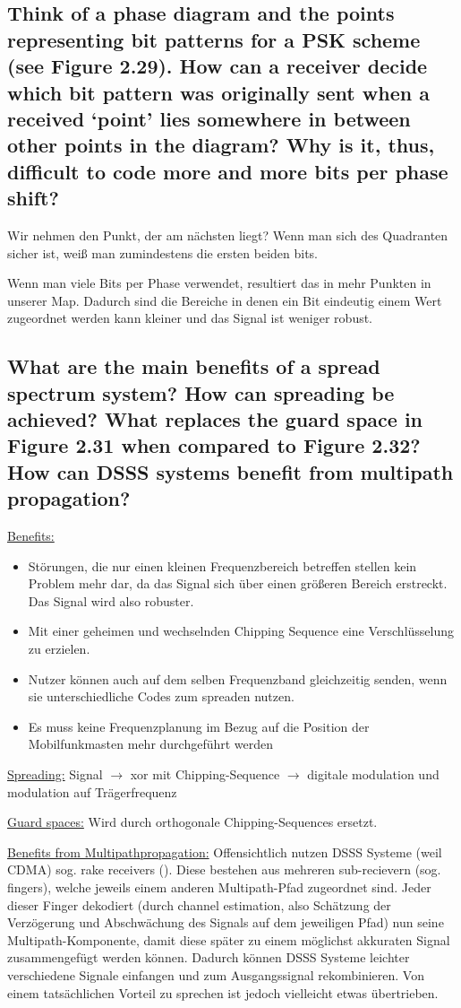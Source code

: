 \subsection{Think of a phase diagram and the points representing bit patterns for a PSK scheme
(see Figure 2.29). How can a receiver decide which bit pattern was originally sent
when a received ‘point’ lies somewhere in between other points in the diagram? Why
is it, thus, difficult to code more and more bits per phase shift?}
Wir nehmen den Punkt, der am nächsten liegt? Wenn man sich des Quadranten sicher ist, weiß man zumindestens die ersten beiden bits.

Wenn man viele Bits per Phase verwendet, resultiert das in mehr Punkten in unserer Map. Dadurch sind die Bereiche in denen ein Bit eindeutig einem Wert zugeordnet werden kann kleiner und das Signal ist weniger robust.


\subsection{What are the main benefits of a spread spectrum system? How can spreading be
achieved? What replaces the guard space in Figure 2.31 when compared to Figure
2.32? How can DSSS systems benefit from multipath propagation?}
\underline{Benefits:}
\begin{itemize}
\item Störungen, die nur einen kleinen Frequenzbereich betreffen stellen kein Problem mehr dar, da das Signal sich über einen größeren Bereich erstreckt. Das Signal wird also robuster.
\item Mit einer geheimen und wechselnden Chipping Sequence eine Verschlüsselung zu erzielen.
\item Nutzer können auch auf dem selben Frequenzband gleichzeitig senden, wenn sie unterschiedliche Codes zum spreaden nutzen.
\item Es muss keine Frequenzplanung im Bezug auf die Position der Mobilfunkmasten mehr durchgeführt werden
\end{itemize}

\underline{Spreading:} Signal $\rightarrow$ xor mit Chipping-Sequence $\rightarrow$ digitale modulation und modulation auf Trägerfrequenz

\underline{Guard spaces:} Wird durch orthogonale Chipping-Sequences ersetzt.

\underline{Benefits from Multipathpropagation:} Offensichtlich nutzen DSSS Systeme (weil CDMA) sog. rake receivers (). 
Diese bestehen aus mehreren sub-recievern (sog. fingers), welche jeweils einem anderen Multipath-Pfad zugeordnet sind. Jeder dieser Finger dekodiert (durch channel estimation, also Schätzung der Verzögerung und Abschwächung des Signals auf dem jeweiligen Pfad) nun seine Multipath-Komponente, damit diese später zu einem möglichst akkuraten Signal zusammengefügt werden können. Dadurch können DSSS Systeme leichter verschiedene Signale einfangen und zum Ausgangssignal rekombinieren. Von einem tatsächlichen Vorteil zu sprechen ist jedoch vielleicht etwas übertrieben.


